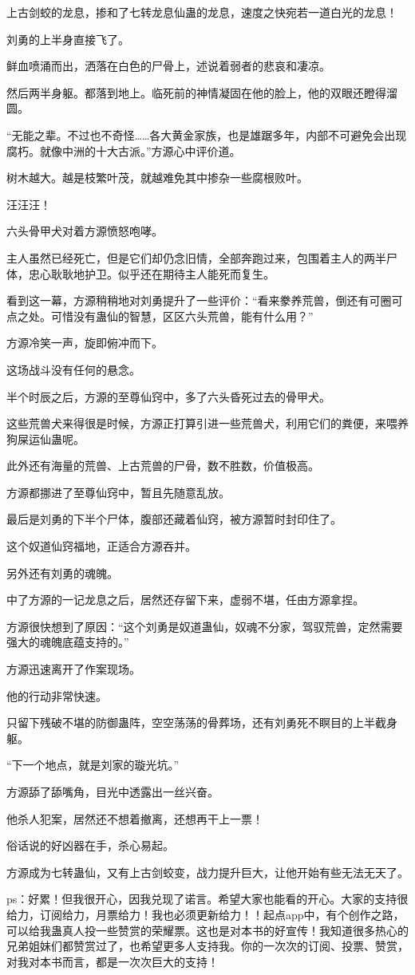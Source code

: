 \begin{this_body}
上古剑蛟的龙息，掺和了七转龙息仙蛊的龙息，速度之快宛若一道白光的龙息！

刘勇的上半身直接飞了。

鲜血喷涌而出，洒落在白色的尸骨上，述说着弱者的悲哀和凄凉。

然后两半身躯。都落到地上。临死前的神情凝固在他的脸上，他的双眼还瞪得溜圆。

“无能之辈。不过也不奇怪……各大黄金家族，也是雄踞多年，内部不可避免会出现腐朽。就像中洲的十大古派。”方源心中评价道。

树木越大。越是枝繁叶茂，就越难免其中掺杂一些腐根败叶。

汪汪汪！

六头骨甲犬对着方源愤怒咆哮。

主人虽然已经死亡，但是它们却仍念旧情，全部奔跑过来，包围着主人的两半尸体，忠心耿耿地护卫。似乎还在期待主人能死而复生。

看到这一幕，方源稍稍地对刘勇提升了一些评价：“看来豢养荒兽，倒还有可圈可点之处。可惜没有蛊仙的智慧，区区六头荒兽，能有什么用？”

方源冷笑一声，旋即俯冲而下。

这场战斗没有任何的悬念。

半个时辰之后，方源的至尊仙窍中，多了六头昏死过去的骨甲犬。

这些荒兽犬来得很是时候，方源正打算引进一些荒兽犬，利用它们的粪便，来喂养狗屎运仙蛊呢。

此外还有海量的荒兽、上古荒兽的尸骨，数不胜数，价值极高。

方源都挪进了至尊仙窍中，暂且先随意乱放。

最后是刘勇的下半个尸体，腹部还藏着仙窍，被方源暂时封印住了。

这个奴道仙窍福地，正适合方源吞并。

另外还有刘勇的魂魄。

中了方源的一记龙息之后，居然还存留下来，虚弱不堪，任由方源拿捏。

方源很快想到了原因：“这个刘勇是奴道蛊仙，奴魂不分家，驾驭荒兽，定然需要强大的魂魄底蕴支持的。”

方源迅速离开了作案现场。

他的行动非常快速。

只留下残破不堪的防御蛊阵，空空荡荡的骨葬场，还有刘勇死不瞑目的上半截身躯。

“下一个地点，就是刘家的璇光坑。”

方源舔了舔嘴角，目光中透露出一丝兴奋。

他杀人犯案，居然还不想着撤离，还想再干上一票！

俗话说的好凶器在手，杀心易起。

方源成为七转蛊仙，又有上古剑蛟变，战力提升巨大，让他开始有些无法无天了。

ps：好累！但我很开心，因我兑现了诺言。希望大家也能看的开心。大家的支持很给力，订阅给力，月票给力！我也必须更新给力！！起点app中，有个创作之路，可以给我蛊真人投一些赞赏的荣耀票。这也是对本书的好宣传！我知道很多热心的兄弟姐妹们都赞赏过了，也希望更多人支持我。你的一次次的订阅、投票、赞赏，对我对本书而言，都是一次次巨大的支持！

\end{this_body}


